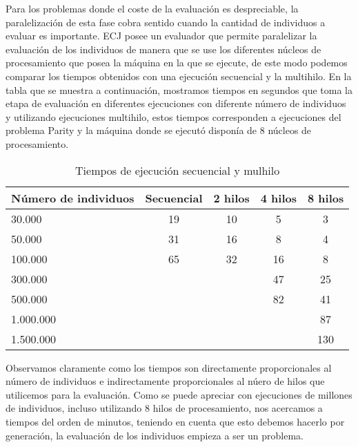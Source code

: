 \label{resultados-parity}

Para los problemas donde el coste de la evaluación es despreciable, la paralelizaci\'on de esta fase cobra sentido cuando la cantidad de individuos a evaluar es importante. ECJ posee un evaluador que permite paralelizar la evaluación de los individuos de manera que se use los diferentes núcleos de procesamiento que posea la m\'aquina en la que se ejecute, de este modo podemos comparar los tiempos obtenidos con una ejecución secuencial y la multihilo. En la tabla que se muestra a continuación, mostramos tiempos en segundos que toma la etapa de evaluación en diferentes ejecuciones con diferente n\'umero de individuos y utilizando ejecuciones multihilo, estos tiempos corresponden a ejecuciones del problema Parity y la m\'aquina donde se ejecut\'o disponía de 8 núcleos de procesamiento.

\begin{table}[H]
  \begin{center}
    \begin{center}
    \begin{tabular}{l | c c c c}
    N\'umero de individuos & Secuencial & 2 hilos & 4 hilos & 8 hilos \\ \hline
    30.000 & 19 & 10 & 5 & 3\\
    50.000 & 31 & 16 & 8 & 4\\
    100.000 & 65 & 32 & 16 & 8\\
    300.000 & & & 47 & 25\\
    500.000 & & & 82 & 41\\
    1.000.000 & & & & 87\\
    1.500.000 & & & & 130\\
    \end{tabular}
    \end{center}
    \caption{Tiempos de ejecución secuencial y mulhilo}
    \label{tabla_tiempos_ecj}
  \end{center}
\end{table}

Observamos claramente como los tiempos son directamente proporcionales al n\'umero de individuos e indirectamente proporcionales al n\'uero de hilos que utilicemos para la evaluación. Como se puede apreciar con ejecuciones de millones de individuos, incluso utilizando 8 hilos de procesamiento, nos acercamos a tiempos del orden de minutos, teniendo en cuenta que esto debemos hacerlo por generación, la evaluación de los individuos empieza a ser un problema. 

